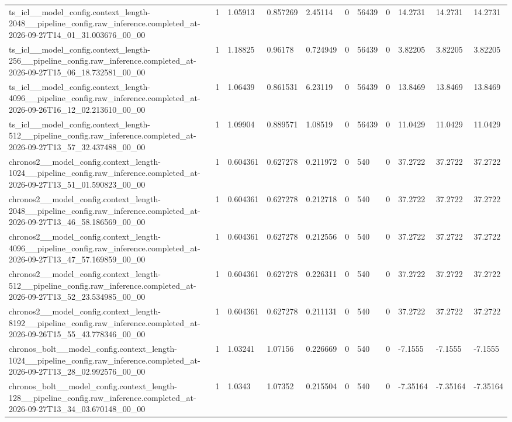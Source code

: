 \begin{tabular}{lllllllllll}
ts\_icl\_\_model\_config.context\_length-2048\_\_pipeline\_config.raw\_inference.completed\_at-2026-09-27T14\_01\_31.003676\_00\_00 & 1 & 1.05913 & 0.857269 & 2.45114 & 0 & 56439 & 0 & 14.2731 & 14.2731 & 14.2731 \\
ts\_icl\_\_model\_config.context\_length-256\_\_pipeline\_config.raw\_inference.completed\_at-2026-09-27T15\_06\_18.732581\_00\_00 & 1 & 1.18825 & 0.96178 & 0.724949 & 0 & 56439 & 0 & 3.82205 & 3.82205 & 3.82205 \\
ts\_icl\_\_model\_config.context\_length-4096\_\_pipeline\_config.raw\_inference.completed\_at-2026-09-26T16\_12\_02.213610\_00\_00 & 1 & 1.06439 & 0.861531 & 6.23119 & 0 & 56439 & 0 & 13.8469 & 13.8469 & 13.8469 \\
ts\_icl\_\_model\_config.context\_length-512\_\_pipeline\_config.raw\_inference.completed\_at-2026-09-27T13\_57\_32.437488\_00\_00 & 1 & 1.09904 & 0.889571 & 1.08519 & 0 & 56439 & 0 & 11.0429 & 11.0429 & 11.0429 \\
chronos2\_\_model\_config.context\_length-1024\_\_pipeline\_config.raw\_inference.completed\_at-2026-09-27T13\_51\_01.590823\_00\_00 & 1 & 0.604361 & 0.627278 & 0.211972 & 0 & 540 & 0 & 37.2722 & 37.2722 & 37.2722 \\
chronos2\_\_model\_config.context\_length-2048\_\_pipeline\_config.raw\_inference.completed\_at-2026-09-27T13\_46\_58.186569\_00\_00 & 1 & 0.604361 & 0.627278 & 0.212718 & 0 & 540 & 0 & 37.2722 & 37.2722 & 37.2722 \\
chronos2\_\_model\_config.context\_length-4096\_\_pipeline\_config.raw\_inference.completed\_at-2026-09-27T13\_47\_57.169859\_00\_00 & 1 & 0.604361 & 0.627278 & 0.212556 & 0 & 540 & 0 & 37.2722 & 37.2722 & 37.2722 \\
chronos2\_\_model\_config.context\_length-512\_\_pipeline\_config.raw\_inference.completed\_at-2026-09-27T13\_52\_23.534985\_00\_00 & 1 & 0.604361 & 0.627278 & 0.226311 & 0 & 540 & 0 & 37.2722 & 37.2722 & 37.2722 \\
chronos2\_\_model\_config.context\_length-8192\_\_pipeline\_config.raw\_inference.completed\_at-2026-09-26T15\_55\_43.778346\_00\_00 & 1 & 0.604361 & 0.627278 & 0.211131 & 0 & 540 & 0 & 37.2722 & 37.2722 & 37.2722 \\
chronos\_bolt\_\_model\_config.context\_length-1024\_\_pipeline\_config.raw\_inference.completed\_at-2026-09-27T13\_28\_02.992576\_00\_00 & 1 & 1.03241 & 1.07156 & 0.226669 & 0 & 540 & 0 & -7.1555 & -7.1555 & -7.1555 \\
chronos\_bolt\_\_model\_config.context\_length-128\_\_pipeline\_config.raw\_inference.completed\_at-2026-09-27T13\_34\_03.670148\_00\_00 & 1 & 1.0343 & 1.07352 & 0.215504 & 0 & 540 & 0 & -7.35164 & -7.35164 & -7.35164 \\

\end{tabular}
